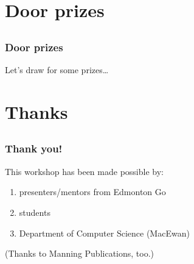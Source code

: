 \section{Door prizes}
\subsection*{}

\begin{frame}[c]
  \frametitle{Door prizes}

  \begin{center}
    \Large{}
    Let's draw for some prizes\dots
  \end{center}
\end{frame}

\section{Thanks}
\subsection*{}

\begin{frame}[t]
  \frametitle{Thank you!}

  This workshop has been made possible by:
  \begin{enumerate}
  \item presenters/mentors from Edmonton Go
  \item students
  \item Department of Computer Science (MacEwan)
  \end{enumerate}

  \vspace{\baselineskip}
  (Thanks to Manning Publications, too.)
\end{frame}


